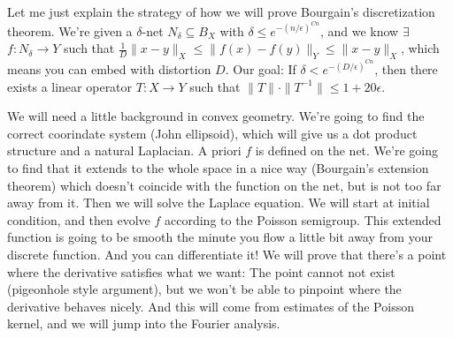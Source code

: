 Let me just explain the strategy of how we will prove Bourgain's discretization theorem. We're given a $\delta$-net $N_{\delta} \subseteq B_X$ with $\delta \leq e^{-(n/\epsilon)^{Cn}}$, and we know $\exists $ $f: N_{\delta} \to Y$ such that $\frac{1}{D}\|x - y\|_X \leq \|f(x) - f(y)\|_Y \leq \|x - y\|_X$, which means you can embed with distortion $D$. Our goal: If $\delta < e^{-(D/\epsilon)^{Cn}}$, then there exists a linear operator $T: X \to Y$ such that $\|T\|\cdot\|T^{-1}\| \leq 1 + 20\epsilon$. 

We will need a little background in convex geometry. We're going to find the correct coorindate system (John ellipsoid), which will give us a dot product structure and a natural Laplacian. A priori $f$ is defined on the net. We're going to find that it extends to the whole space in a nice way (Bourgain's extension theorem) which doesn't coincide with the function on the net, but is not too far away from it. Then we will solve the Laplace equation. We will start at initial condition, and then evolve $f$ according to the Poisson semigroup. This extended function is going to be smooth the minute you flow a little bit away from your discrete function. And you can differentiate it! We will prove that there's a point where the derivative satisfies what we want: The point cannot not exist (pigeonhole style argument), but we won't be able to pinpoint where the derivative behaves nicely. And this will come from estimates of the Poisson kernel, and we will jump into the Fourier analysis. 
